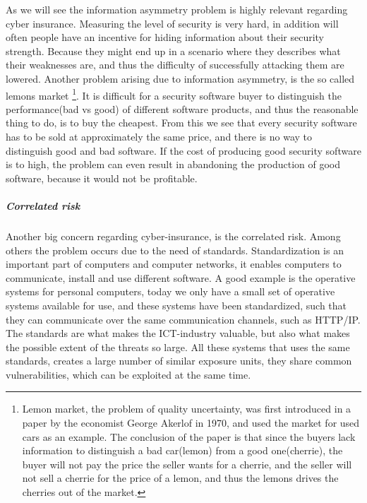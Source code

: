 As we will see the information asymmetry problem is highly relevant regarding cyber insurance.
 Measuring the level of security is very hard, in addition will often people have an incentive for hiding information about their security strength. Because they might end up in a scenario where they describes what their weaknesses are, and thus the difficulty of successfully attacking them are lowered. 
 Another problem arising due to information asymmetry, 
 is the so called lemons market \footnote{Lemon market, the problem of quality uncertainty, was first introduced in a paper \cite{lemonpaper} by the economist George Akerlof in 1970,
       and used the market for used cars as an example.\cite{lemon} The conclusion of the paper is
        that since the buyers lack information to distinguish a bad car(lemon) from a good
         one(cherrie), the buyer will not pay the price the seller wants for a cherrie, 
         and the seller will not sell a cherrie for the price of a lemon, 
         and thus the lemons drives the cherries out of the market.}. It is difficult for a security software buyer to distinguish the
  performance(bad vs good) of different software products, and thus the reasonable thing to do, is to buy the
   cheapest. From this we see that every security software has to be sold at approximately the same
    price, and there is no way to distinguish good and bad software. If the cost of producing
     good security software is to high, the problem can even result in abandoning the production of good software, because it would not be profitable. 
      
      
\subparagraph{Correlated risk}

Another big concern regarding cyber-insurance, is the correlated risk. Among others the problem occurs due to the need of standards. Standardization is an important part of computers and computer networks, it enables computers to communicate, install and use different software. A good example is the operative systems for personal computers,
  today we only have a small set of operative systems available for use, and these systems have been
   standardized, such that they can communicate over the same communication channels, such as HTTP/IP. The standards are what makes the ICT-industry valuable, 
   but also what makes the possible extent of the  threats so large. 
   All these systems that uses the same standards, creates a large number of similar exposure units,
    they share common vulnerabilities, which can be exploited at the same time. 
    
